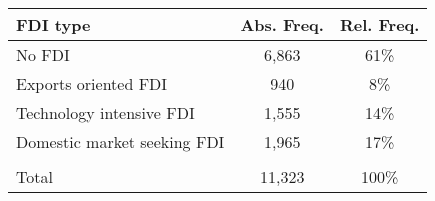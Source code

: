 \begin{threeparttable}
\begin{tabular}{lcc} 
	\toprule \toprule 
	FDI type&Abs. Freq.&Rel. Freq. \\[1ex]
	\midrule
	No FDI							& 6,863		& 61\% \\
	Exports oriented FDI			& 940		& 8\%	\\
	Technology intensive FDI 		& 1,555 	& 14\% 	\\
	Domestic market seeking FDI 	& 1,965 	& 17\% 	\\\\[-1.8ex]
	Total 							& 11,323 	& 100\% \\
	\bottomrule \bottomrule
\end{tabular}
\end{threeparttable}